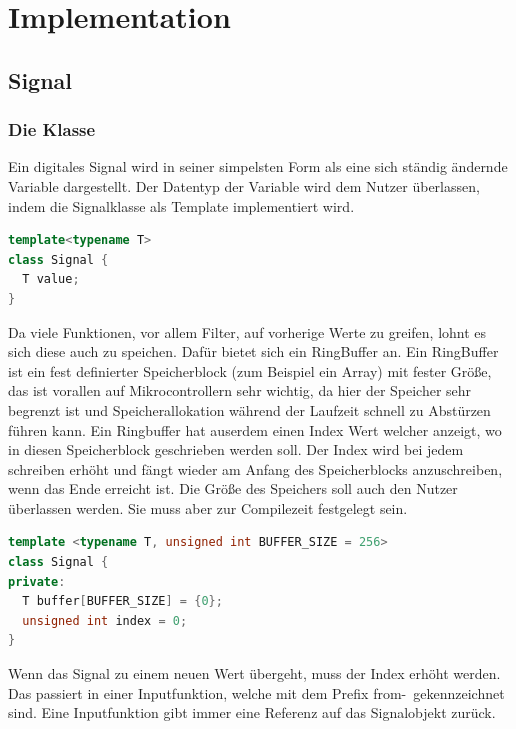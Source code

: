 \section{Implementation}

\subsection{Signal}

\subsubsection{Die Klasse}

Ein digitales Signal wird in seiner simpelsten Form als eine sich ständig
ändernde Variable dargestellt. Der Datentyp der Variable wird dem Nutzer 
überlassen, indem die Signalklasse als Template implementiert wird. 

\begin{lstlisting}[language=C++, 
                       frame=single, 
                       caption={Signalklasse Version 0.1},
                       captionpos=b]
template<typename T>
class Signal {
  T value;
}
\end{lstlisting}

Da viele Funktionen, vor allem 
Filter, auf vorherige Werte zu greifen, lohnt es sich diese auch zu speichen.
Dafür bietet sich ein RingBuffer an. Ein RingBuffer ist ein fest definierter
Speicherblock (zum Beispiel ein Array) mit fester Größe, das ist vorallen 
auf Mikrocontrollern sehr 
wichtig, da hier der Speicher sehr begrenzt ist und Speicherallokation während 
der Laufzeit schnell zu Abstürzen führen kann. Ein Ringbuffer hat auserdem 
einen Index Wert welcher anzeigt, wo in diesen Speicherblock geschrieben 
werden soll. Der Index wird bei jedem schreiben erhöht und fängt wieder am Anfang
des Speicherblocks anzuschreiben, wenn das Ende erreicht ist.
Die Größe des Speichers soll auch den Nutzer überlassen werden. Sie muss aber zur
Compilezeit festgelegt sein.

\begin{lstlisting}[language=C++, 
                       frame=single, 
                       caption={Signalklasse Version 0.2},
                       captionpos=b]
template <typename T, unsigned int BUFFER_SIZE = 256>
class Signal {
private:
  T buffer[BUFFER_SIZE] = {0};
  unsigned int index = 0;
}
\end{lstlisting}

Wenn das Signal zu einem neuen Wert übergeht, muss der Index erhöht werden.
Das passiert in einer Inputfunktion, welche mit dem Prefix \glqq from-\grqq\ 
gekennzeichnet sind. Eine Inputfunktion gibt immer eine Referenz auf das 
Signalobjekt zurück.


